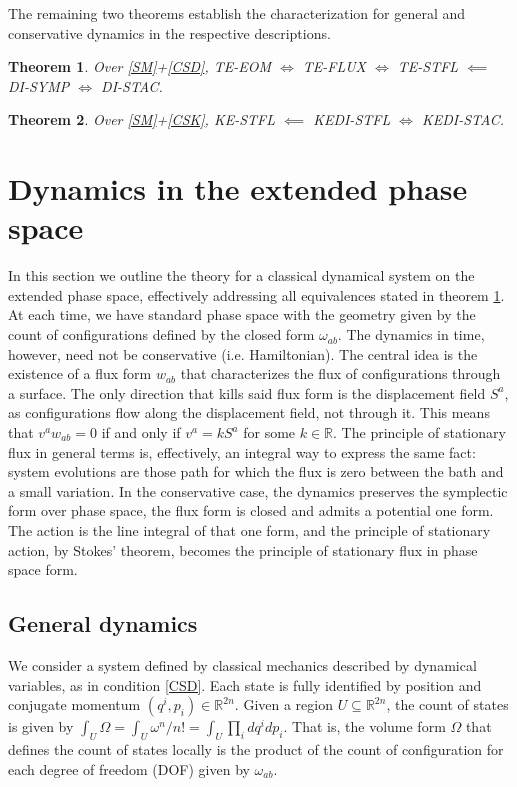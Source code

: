 \documentclass[12pt]{article}
\newtheorem{theorem}{Theorem}
\begin{document}
The remaining two theorems establish the characterization for general and conservative dynamics in the respective descriptions.
\begin{theorem}\label{thrm:dyn}
	Over \ref{SM}+\ref{CSD}, TE-EOM $\iff$ TE-FLUX $\iff$ TE-STFL $\impliedby$ DI-SYMP $\iff$ DI-STAC.
\end{theorem}
\begin{theorem}\label{thrm:kin}
	Over \ref{SM}+\ref{CSK}, KE-STFL $\impliedby$ KEDI-STFL $\iff$ KEDI-STAC.
\end{theorem}

\section{Dynamics in the extended phase space}

In this section we outline the theory for a classical dynamical system on the extended phase space, effectively addressing all equivalences stated in theorem \ref{thrm:dyn}. At each time, we have standard phase space with the geometry given by the count of configurations defined by the closed form $\omega_{ab}$. The dynamics in time, however, need not be conservative (i.e. Hamiltonian). The central idea is the existence of a flux form $w_{ab}$ that characterizes the flux of configurations through a surface. The only direction that kills said flux form is the displacement field $S^a$, as configurations flow along the displacement field, not through it. This means that $v^a w_{ab} = 0$ if and only if $v^a = k S^a$ for some $k \in \mathbb{R}$. The principle of stationary flux in general terms is, effectively, an integral way to express the same fact: system evolutions are those path for which the flux is zero between the bath and a small variation. In the conservative case, the dynamics preserves the symplectic form over phase space, the flux form is closed and admits a potential one form. The action is the line integral of that one form, and the principle of stationary action, by Stokes' theorem, becomes the principle of stationary flux in phase space form.

\subsection{General dynamics}

We consider a system defined by classical mechanics described by dynamical variables, as in condition \ref{CSD}. Each state is fully identified by position and conjugate momentum $(q^i,p_i) \in \mathbb{R}^{2n}$. Given a region $U \subseteq \mathbb{R}^{2n}$, the count of states is given by $\int_U \Omega = \int_U \omega^n / n! = \int_U \prod_i dq^i dp_i$. That is, the volume form $\Omega$ that defines the count of states locally is the product of the count of configuration for each degree of freedom (DOF) given by $\omega_{ab}$.
\end{document}
